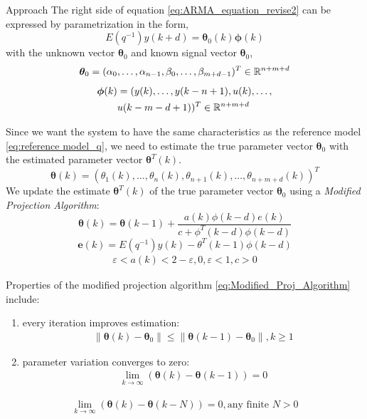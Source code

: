 \begin{section}{Approach}
The right side of equation \eqref{eq:ARMA_equation_revise2} can be expressed by parametrization in the form,
    \begin{equation}
	E(q^{-1})y(k+d)=\bm{\theta}_0(k)\bm{\phi}(k)
	\end{equation}
with the unknown vector $\bm{\theta}_0$ and known signal vector $\bm{\theta}_0$,
    \begin{equation}
	\bm{\theta}_0=(\alpha_0, \dots ,\alpha_{n-1},\beta_0, \dots ,\beta_{m+d-1})^T \in \mathbb{R}^{n+m+d}
	\end{equation}
	\begin{align}
	\begin{split}
	\bm{\phi}(k)&=(y(k), \dots ,y(k-n+1),u(k), \dots , \\
	& u(k-m-d+1))^T \in \mathbb{R}^{n+m+d}
	\end{split}
	\end{align}
	
Since we want the system to have the same characteristics as the reference model \eqref{eq:reference model_q}, we need to estimate the true parameter vector $\bm{\theta}_0$ with the estimated parameter vector $\bm{\theta}^T(k)$. 
    \begin{equation}
    \bm{\theta}(k)=(\theta_1(k), \dots ,\theta_n(k),\theta_{n+1}(k), \dots ,\theta_{n+m+d}(k))^T
	\end{equation}
We update the estimate $\bm{\theta}^T(k)$ of the true parameter vector $\bm{\theta}_0$ using a \textit{Modified Projection Algorithm}:
	\begin{equation}
	\label{eq:Modified_Proj_Algorithm}
	\bm{\theta}(k)=\bm{\theta}(k-1)+\frac{a(k)\phi(k-d)e(k)}{c+\phi^T(k-d)\phi(k-d)}
	\end{equation}
	\begin{equation}
	\bm{e}(k)=E(q^{-1})y(k)-\theta^T(k-1)\phi(k-d)
	\end{equation}
	\begin{align*}
	\varepsilon<a(k)<2-\varepsilon, 0,\varepsilon<1, c>0
	\end{align*}
	
Properties of the modified projection algorithm \eqref{eq:Modified_Proj_Algorithm} include:
    \begin{enumerate}[label=(\roman*),leftmargin=4\parindent]
	\item every iteration improves estimation:
	    \begin{align}
	        \|\bm{\theta}(k)-\bm{\theta}_0\|\leq\|\bm{\theta}(k-1)-\bm{\theta}_0\|, k\geq1 \nonumber
	    \end{align}
	\item parameter variation converges to zero:
	    \begin{align}
	        \lim_{k\to\infty}(\bm{\theta}(k)-\bm{\theta}(k-1))=0 \nonumber
	    \end{align}
	\end{enumerate}
	\begin{align}
	   \lim_{k\to\infty}(\bm{\theta}(k)-\bm{\theta}(k-N))=0, \text{any finite } N>0 \nonumber
	\end{align}
	

\end{section}
